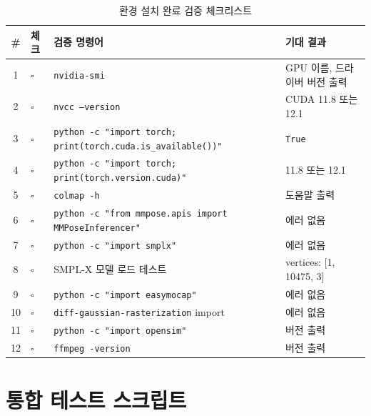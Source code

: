 \documentclass[11pt, a4paper]{report}
\begin{document}
\begin{table}[H]
\centering
\caption{환경 설치 완료 검증 체크리스트}
\label{tab:verification}
\renewcommand{\arraystretch}{1.4}
\small
\begin{tabularx}{\textwidth}{clXl}
\toprule
\textbf{\#} & \textbf{체크} & \textbf{검증 명령어} & \textbf{기대 결과} \\
\midrule
1 & $\square$ & \texttt{nvidia-smi} & GPU 이름, 드라이버 버전 출력 \\
2 & $\square$ & \texttt{nvcc --version} & CUDA 11.8 또는 12.1 \\
3 & $\square$ & \texttt{python -c "import torch; print(torch.cuda.is\_available())"} & \texttt{True} \\
4 & $\square$ & \texttt{python -c "import torch; print(torch.version.cuda)"} & 11.8 또는 12.1 \\
5 & $\square$ & \texttt{colmap -h} & 도움말 출력 \\
6 & $\square$ & \texttt{python -c "from mmpose.apis import MMPoseInferencer"} & 에러 없음 \\
7 & $\square$ & \texttt{python -c "import smplx"} & 에러 없음 \\
8 & $\square$ & SMPL-X 모델 로드 테스트 & vertices: [1, 10475, 3] \\
9 & $\square$ & \texttt{python -c "import easymocap"} & 에러 없음 \\
10 & $\square$ & \texttt{diff-gaussian-rasterization} import & 에러 없음 \\
11 & $\square$ & \texttt{python -c "import opensim"} & 버전 출력 \\
12 & $\square$ & \texttt{ffmpeg -version} & 버전 출력 \\
\bottomrule
\end{tabularx}
\end{table}


\section{통합 테스트 스크립트}
\end{document}
